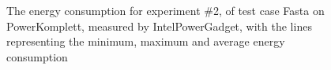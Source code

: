 \begin{figure}
                    \caption{The energy consumption for experiment \#2, of test case Fasta on PowerKomplett, measured by IntelPowerGadget, with the lines representing the minimum, maximum and average energy consumption} \label{fig:time_series_Fasta_PowerKomplett_IntelPowerGadget_exp2}
                    \end{figure}
                    